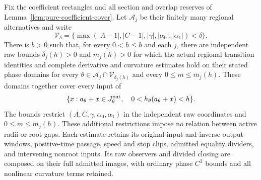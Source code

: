 \begin{proposition}
\label{prop:regional-raw-budgets}
Fix the coefficient rectangles and all section and overlap reserves of
Lemma~\ref{lem:pure-coefficient-cover}. Let \(\mathcal A_j\) be their
finitely many regional alternatives and write
\[
\mathcal V_\delta=\{\max(|A-1|,|C-1|,|\gamma|,
                                  |\alpha_0|,|\alpha_1|)<\delta\}.
\]
There is \(b>0\) such that, for every
\(0<h\le b\) and each \(j\), there are independent raw bounds
\(\delta_j(h)>0\) and \(\bar m_j(h)>0\) for which the actual regional
transition identities and complete derivative and curvature estimates
hold on their stated phase domains for every
\(\theta\in\mathcal A_j\cap\mathcal V_{\delta_j(h)}\) and every
\(0\le m\le\bar m_j(h)\). These domains together cover every input of
\begin{equation}\label{eq:regional-raw-budget-domain}
\{x:a_\theta+x\in J_\theta^{\rm out},\quad
                         0<h_\theta(a_\theta+x)<h\}.
\end{equation}
The bounds restrict \((A,C,\gamma,\alpha_0,\alpha_1)\) in the
independent raw coordinates and \(0\le m\le\bar m_j(h)\).
These additional restrictions impose no relation between active radii
or root gaps.
Each estimate retains its original input and inverse output windows,
positive-time passage, speed and stop clips, admitted equality dividers,
and intervening nonroot inputs. Its raw observers and divided closing
are composed on their full admitted images, with ordinary phase
\(C^3\) bounds and all nonlinear curvature terms retained.
\end{proposition}

